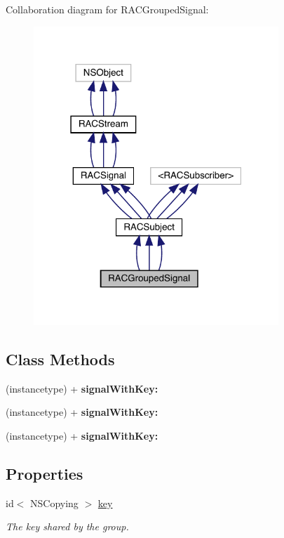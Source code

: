 Collaboration diagram for R\+A\+C\+Grouped\+Signal\+:\nopagebreak
\begin{figure}[H]
\begin{center}
\leavevmode
\includegraphics[width=262pt]{interface_r_a_c_grouped_signal__coll__graph}
\end{center}
\end{figure}
\subsection*{Class Methods}
\begin{DoxyCompactItemize}
\item 
\mbox{\label{interface_r_a_c_grouped_signal_ae8e4776e416d890cfd43e57addd8bb04}} 
(instancetype) + {\bfseries signal\+With\+Key\+:}
\item 
\mbox{\label{interface_r_a_c_grouped_signal_ae8e4776e416d890cfd43e57addd8bb04}} 
(instancetype) + {\bfseries signal\+With\+Key\+:}
\item 
\mbox{\label{interface_r_a_c_grouped_signal_ae8e4776e416d890cfd43e57addd8bb04}} 
(instancetype) + {\bfseries signal\+With\+Key\+:}
\end{DoxyCompactItemize}
\subsection*{Properties}
\begin{DoxyCompactItemize}
\item 
\mbox{\label{interface_r_a_c_grouped_signal_adbcbc4bea85d4e9a55c937bddfb4b3bd}} 
id$<$ N\+S\+Copying $>$ \mbox{\hyperlink{interface_r_a_c_grouped_signal_adbcbc4bea85d4e9a55c937bddfb4b3bd}{key}}
\begin{DoxyCompactList}\small\item\em The key shared by the group. \end{DoxyCompactList}\end{DoxyCompactItemize}
